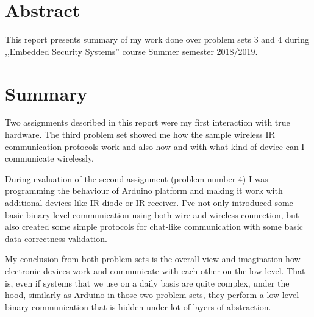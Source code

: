 \documentclass[12pt]{article}
\begin{document}


\section{Abstract}

This report presents summary of my work done over problem sets 3 and 4
during ,,Embedded Security Systems'' course Summer semester 2018/2019.




\section{Summary}
Two assignments described in this report were my first interaction with true hardware. The third problem set showed me how the sample wireless IR communication protocols work and also how and with what kind of device can I communicate wirelessly.

During evaluation of the second assignment (problem number 4) I was programming the behaviour of Arduino platform and making it work with additional devices like IR diode or IR receiver. I've not only introduced some basic binary level communication using both wire and wireless connection, but also created some simple protocols for chat-like communication with some basic data correctness validation.

My conclusion from both problem sets is the overall view and imagination how electronic devices work and communicate with each other on the low level. That is, even if systems that we use on a daily basis are quite complex, under the hood, similarly as Arduino in those two problem sets, they perform a low level binary communication that is hidden under lot of layers of abstraction.
\end{document}

